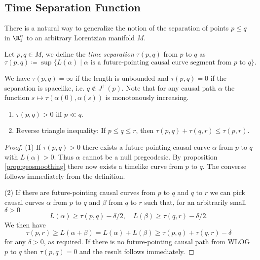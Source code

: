 \subsection{Time Separation Function}
There is a natural way to generalize the notion of the separation of points $p\leq q$ in $\R^n_1$ to an arbitrary Lorentzian manifold $M$.
\begin{definition}
Let $p,q\in M$, we define the \emph{time separation} $\tau(p,q)$ from $p$ to $q$ as
\[
\tau(p,q)\coloneqq \sup \{L(\alpha) \mid \alpha \text{ is a future-pointing causal curve segment from }p \text{ to }q\}.
\]
\end{definition}
We have $\tau(p,q) = \infty$ if the length is unbounded and $\tau(p,q)=0$ if the separation is spacelike, i.e. $q\notin J^+(p)$.
Note that for any causal path $\alpha$ the function $s\mapsto \tau(\alpha(0),\alpha(s))$ is monotonously increasing.

\begin{lemma}
\begin{enumerate}[label={\textnormal{(\arabic*)}}]
    \item $\tau(p,q)>0$ iff $p\ll q$.
    \item Reverse triangle inequality: If $p\leq q\leq r$, then $\tau(p,q)+\tau(q,r)\leq \tau(p,r)$.
\end{enumerate}
\end{lemma}
\begin{proof}
(1) If $\tau(p,q)>0$ there exists a future-pointing causal curve $\alpha$ from $p$ to $q$ with $L(\alpha)>0$. Thus $\alpha$ cannot be a null pregeodesic. By proposition \ref{prop:geosmoothing} there now exists a timelike curve from $p$ to $q$. The converse follows immediately from the definition.

(2) If there are future-pointing causal curves from $p$ to $q$ and $q$ to $r$ we can pick causal curves $\alpha$ from $p$ to $q$ and $\beta$ from $q$ to $r$ such that, for an arbitrarily small $\delta>0$
\[
L(\alpha) \ge \tau(p,q)-\delta/2, \quad L(\beta) \ge \tau(q,r)-\delta/2.
\]
We then have 
\[
\tau(p,r) \ge L(\alpha+\beta) = L(\alpha) + L(\beta) \ge \tau(p,q) + \tau(q,r) - \delta
\] for any $\delta>0$, as required.
If there is no future-pointing causal path from WLOG $p$ to $q$ then $\tau(p,q)=0$ and the result follows immediately.
\end{proof}

